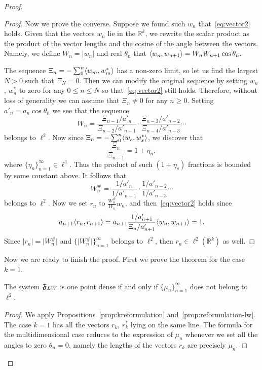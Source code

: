 \begin{proof}
\begin{proof}
      Now we prove the converse.
      Suppose we found such $w_n$ that~\eqref{eq:vector2} holds.
      Given that the vectors $w_n$ lie in the $\mathbb{R}^k$, we rewrite the scalar product as
        the product of the vector lengths and the cosine of the angle between the vectors.
      Namely, we define $W_n = \lvert w_n\rvert$ and real $\theta_n$ that
        $\langle w_{n}, w_{n+1} \rangle = W_n W_{n+1} \cos{\theta_n}.$

      The sequence $\Xi_n = -\sum_0^n \langle w_m, w^*_m \rangle$ has a non-zero limit, so let us
        find the largest $N > 0$ such that $\Xi_N = 0$.
      Then we can modify the original sequence by setting $w_n$, $w^*_n$ to zero for any $0 \leq n \leq N$ so that~\eqref{eq:vector2}
        still holds.
      Therefore, without loss of generality we can assume that $\Xi_n \neq 0$ for any $n \geq 0$.
      Setting $a'_n = a_n \cos{\theta_n}$ we see that the sequence
      \[
        W_n = \frac{\Xi_{n-1}/a'_n}{\Xi_{n-2}/a'_{n-1}} \cdot \frac{\Xi_{n-3}/a'_{n-2}}{\Xi_{n-4}/a'_{n-3}} \cdots
      \]
        belongs to $\ell^2$.
      Now since $\Xi_n = -\sum_0^n \langle w_s, w^*_s \rangle$, we discover that
      \[
        \frac{\Xi_n}{\Xi_{n-1}} = 1 + \eta_n,
      \]
        where $\{\eta_n\}_{n=1}^\infty \in \ell^1$.
      Thus the product of such $(1 + \eta_s)$ fractions is bounded by some constant above.
      It follows that
      \[
        W^\#_n = \frac{1/a'_n}{1/a'_{n-1}} \cdot \frac{1/a'_{n-2}}{1/a'_{n-3}} \cdots
      \]
        belongs to $\ell^2$.
      Now we set $r_n$ to $\frac{W^\#_n}{W_n}w_n$, and then~\eqref{eq:vector2} holds since
      \[
        a_{n+1} \langle r_n, r_{n+1} \rangle = a_{n+1} \frac{1/a'_{n+1}}{\Xi_n/a'_{n+1}} \langle w_n, w_{n+1} \rangle = 1.
      \]
      Since $\lvert r_n \rvert = \lvert W^\#_n \rvert$ and $\{\lvert W^\#_n \rvert\}_{n=1}^\infty$ belongs to $\ell^2$,
        then $r_n \in \ell^2(\mathbb{R}^k)$ as well.
    \end{proof}

    Now we are ready to finish the proof.
    First we prove the theorem for the case $k=1$.
    \begin{prop}
      The system $\mathfrak{F}_{LW}$ is one point dense if and only if $\{\mu_n\}_{n=1}^\infty$ does not belong to $\ell^2$.
    \end{prop}
    \begin{proof}
      We apply Propositions~\ref{prop:kreformulation} and~\ref{prop:reformulation-lw}.
      The case $k=1$ has all the vectors $r_k$, $r^*_k$ lying on the same line.
      The formula for the multidimensional case reduces to the expression of $\mu_n$ whenever we set all the angles to zero $\theta_n = 0$,
        namely the lengths of the vectors $r_k$ are precisely $\mu_n$.
    \end{proof}


\end{proof}
